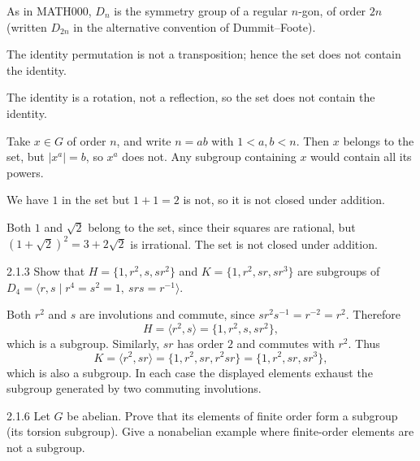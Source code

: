 \documentclass[11pt,oneside]{article}
\begin{document}
\begin{notation}
As in MATH000, $D_n$ is the symmetry group of a regular $n$-gon, of order $2n$ (written $D_{2n}$ in the alternative convention of Dummit--Foote).
\end{notation}

\begin{solution}
\begin{exercisesubparts}
\item The identity permutation is not a transposition; hence the set does not contain the identity.
\item The identity is a rotation, not a reflection, so the set does not contain the identity.
\item Take $x\in G$ of order $n$, and write $n=ab$ with $1<a,b<n$. Then $x$ belongs to the set, but $|x^a|=b$, so $x^a$ does not. Any subgroup containing $x$ would contain all its powers.
\item We have $1$ in the set but $1+1=2$ is not, so it is not closed under addition.
\item Both $1$ and $\sqrt2$ belong to the set, since their squares are rational, but $(1+\sqrt2)^2=3+2\sqrt2$ is irrational. The set is not closed under addition.
\end{exercisesubparts}
\end{solution}

\begin{exercise}{2.1.3}
Show that $H=\{1,r^2,s,sr^2\}$ and $K=\{1,r^2,sr,sr^3\}$ are subgroups of $D_4=\langle r,s\mid r^4=s^2=1,\ srs=r^{-1}\rangle$.
\end{exercise}

\begin{solution}
Both $r^2$ and $s$ are involutions and commute, since $sr^2s^{-1}=r^{-2}=r^2$. Therefore
\[
 H=\langle r^2,s\rangle=\{1,r^2,s,sr^2\},
\]
which is a subgroup. Similarly, $sr$ has order $2$ and commutes with $r^2$. Thus
\[
 K=\langle r^2,sr\rangle=\{1,r^2,sr,r^2sr\}=\{1,r^2,sr,sr^3\},
\]
which is also a subgroup. In each case the displayed elements exhaust the subgroup generated by two commuting involutions.
\end{solution}

\begin{exercise}{2.1.6}
Let $G$ be abelian. Prove that its elements of finite order form a subgroup (its torsion subgroup). Give a nonabelian example where finite-order elements are not a subgroup.
\end{exercise}
\end{document}
